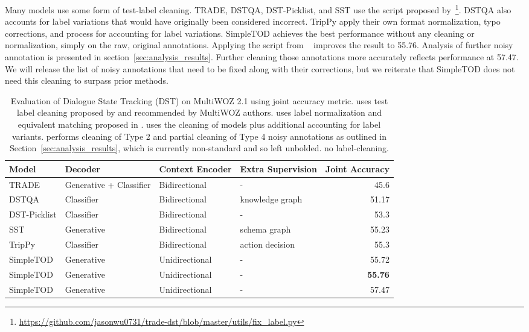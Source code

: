 \documentclass{article}
\begin{document}
Many models use some form of test-label cleaning.
TRADE, DSTQA, DST-Picklist, and SST use the script proposed by~\citet{trade2019wu}\footnote{\url{https://github.com/jasonwu0731/trade-dst/blob/master/utils/fix\_label.py}}.
DSTQA also accounts for label variations that would have originally been considered incorrect.
TripPy apply their own format normalization, typo corrections, and process for accounting for label variations.
SimpleTOD achieves the best performance without any cleaning or normalization, simply on the raw, original annotations. 
Applying the script from ~\citet{trade2019wu} improves the result to 55.76.
Analysis of further noisy annotation is presented in section~\ref{sec:analysis_results}.
Further cleaning those annotations more accurately reflects performance at 57.47.
We will release the list of noisy annotations that need to be fixed along with their corrections, but we reiterate that SimpleTOD does not need this cleaning to surpass prior methods.

\begin{table}[t]
\small
\centering
\begin{tabular}{llllr}
\hline Model & Decoder & Context Encoder & Extra Supervision & Joint Accuracy \\ 
\hline
TRADE & Generative + Classifier & Bidirectional & - & 45.6 \\ DSTQA & Classifier & Bidirectional & knowledge graph & 51.17 \\ DST-Picklist & Classifier & Bidirectional & - & 53.3 \\ 

SST & Generative & Bidirectional & schema graph & 55.23 \\
TripPy & Classifier & Bidirectional & action decision & 55.3 \\
SimpleTOD &  Generative & Unidirectional & - & 55.72 \\
SimpleTOD  &  Generative & Unidirectional & - & \textbf{55.76} \\
SimpleTOD  &  Generative & Unidirectional & - & 57.47 \\

\hline
\end{tabular}
\vspace{1mm}
\caption{\label{font-table} 
Evaluation of Dialogue State Tracking (DST) on MultiWOZ 2.1 using joint accuracy metric. 
 uses test label cleaning proposed by \citet{trade2019wu} and recommended by MultiWOZ authors. 
 uses label normalization and equivalent matching proposed in \citet{heck2020trippy}. 
 uses the cleaning of  models plus additional accounting for label variants. 
 performs cleaning of Type 2 and partial cleaning of Type 4 noisy annotations as outlined in Section~\ref{sec:analysis_results}, which is currently non-standard and so left unbolded.
 no label-cleaning. 
}
\label{tab:dst}
\end{table}
\end{document}
